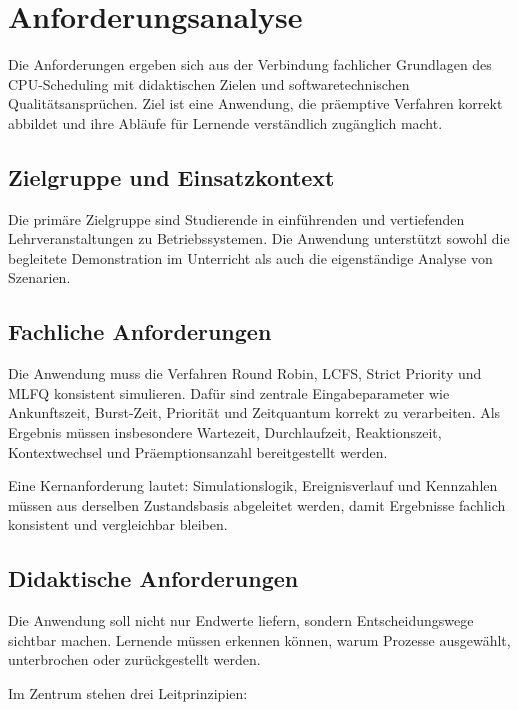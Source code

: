 

\iffalse
\chapter{Anforderungsanalyse}

Die Anforderungen ergeben sich aus der Verbindung fachlicher Grundlagen des CPU-Scheduling mit didaktischen Zielen und softwaretechnischen Qualitätsansprüchen. Ziel ist eine Anwendung, die präemptive Verfahren korrekt abbildet und ihre Abläufe für Lernende verständlich zugänglich macht.

\section{Zielgruppe und Einsatzkontext}

Die primäre Zielgruppe sind Studierende in einführenden und vertiefenden Lehrveranstaltungen zu Betriebssystemen. Die Anwendung unterstützt sowohl die begleitete Demonstration im Unterricht als auch die eigenständige Analyse von Szenarien.

\section{Fachliche Anforderungen}

Die Anwendung muss die Verfahren Round Robin, LCFS, Strict Priority und MLFQ konsistent simulieren. Dafür sind zentrale Eingabeparameter wie Ankunftszeit, Burst-Zeit, Priorität und Zeitquantum korrekt zu verarbeiten. Als Ergebnis müssen insbesondere Wartezeit, Durchlaufzeit, Reaktionszeit, Kontextwechsel und Präemptionsanzahl bereitgestellt werden.

Eine Kernanforderung lautet: Simulationslogik, Ereignisverlauf und Kennzahlen müssen aus derselben Zustandsbasis abgeleitet werden, damit Ergebnisse fachlich konsistent und vergleichbar bleiben.

\section{Didaktische Anforderungen}

Die Anwendung soll nicht nur Endwerte liefern, sondern Entscheidungswege sichtbar machen. Lernende müssen erkennen können, warum Prozesse ausgewählt, unterbrochen oder zurückgestellt werden.

Im Zentrum stehen drei Leitprinzipien:

